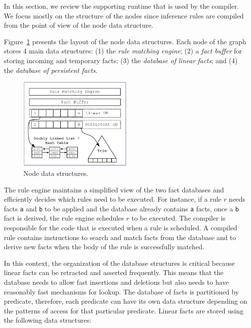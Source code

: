 In this section, we review the supporting runtime that is used by the compiler.
We focus mostly on the structure of the nodes since inference rules are compiled
from the point of view of the node data structure.

Figure~\ref{fig:node} presents the layout of the node data structures.  Each
node of the graph stores 4 main data structures: (1) the \emph{rule matching
   engine}; (2) a \emph{fact buffer} for storing incoming and temporary facts;
(3) the \emph{database of linear facts}; and (4) the \emph{database of
   persistent facts}.

\begin{figure}
\begin{center}
   \includegraphics[width=0.5\textwidth]{figures/overview.pdf}
\end{center}
\caption{Node data structures.}
\label{fig:node}
\end{figure}

The rule engine maintains a simplified view of the two fact databases and
efficiently decides which rules need to be executed. For instance, if a rule $r$
needs facts \texttt{a} and \texttt{b} to be applied and the database already
contains \texttt{a} facts, once a \texttt{b} fact is derived, the rule engine
schedules $r$ to be executed. The compiler is responsible for the code that is
executed when a rule is scheduled.  A compiled rule contains instructions to
search and match facts from the database and to derive new facts when the body
of the rule is successfully matched.

In this context, the organization of the database structures is critical because
linear facts can be retracted and asserted frequently. This means that the
database needs to allow fast insertions and deletions but also needs to have
reasonably fast mechanisms for lookup. The database of facts is partitioned by
predicate, therefore, each predicate can have its own data structure depending
on the patterns of access for that particular predicate. Linear facts are stored
using the following data structures:


